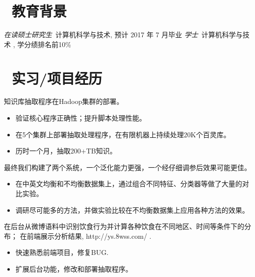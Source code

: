 \documentclass{resume}
\begin{document}



\section{\faGraduationCap\  教育背景}
\textit{在读硕士研究生}\ 计算机科学与技术, 预计 2017 年 7 月毕业
\textit{学士}\ 计算机科学与技术 , 学分绩排名前10\%

\section{\faUsers\ 实习/项目经历}
知识库抽取程序在Hadoop集群的部署。
\begin{itemize}
  \item 验证核心程序正确性；提升脚本处理性能。
  \item 在5个集群上部署抽取处理程序，在有限机器上持续处理20K个百灵库。
  \item 历时一个月，抽取200+TB知识。
\end{itemize}

\begin{onehalfspacing}
最终我们构建了两个系统，一个泛化能力更强，一个经仔细调参后效果可能更佳。
\begin{itemize}
  \item 在中英文均衡和不均衡数据集上，通过组合不同特征、分类器等做了大量的对比实验。
  \item 调研尽可能多的方法，并做实验比较在不均衡数据集上应用各种方法的效果。
\end{itemize}
\end{onehalfspacing}

\begin{onehalfspacing}
在后台从微博语料中识别饮食行为并计算各种饮食在不同地区、时间等条件下的分布；
在前端展示分析结果, http://ys.8wss.com/ .
\begin{itemize}
  \item 快速熟悉前端项目，修复BUG.
  \item 扩展后台功能，修改和部署抽取程序。
\end{itemize}
\end{onehalfspacing}
\end{document}
